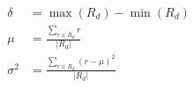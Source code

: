 \documentclass{article}
\begin{document}
	\begin{align*}
		\delta &= \max(R_d) - \min(R_d) \\[4pt]
		\mu &= \frac{\sum_{r\in R_d} r}{|R_d|} \\[4pt] 
	\sigma^2 &= \frac{\sum_{r\in R_d} (r-\mu)^2}{|R_d|}
\end{align*}
\end{document}
